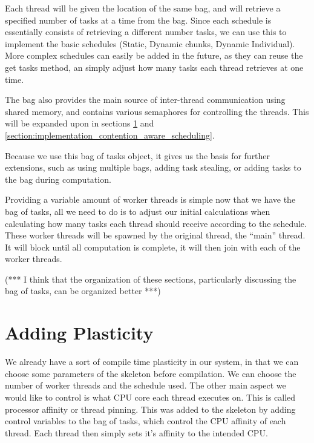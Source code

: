 Each thread will be given the location of the same bag, and will retrieve a specified number of tasks at a time from the bag. Since each schedule is essentially consists of retrieving a different number tasks, we can use this to implement the basic schedules (Static, Dynamic chunks, Dynamic Individual). More complex schedules can easily be added in the future, as they can reuse the get tasks method, an simply adjust how many tasks each thread retrieves at one time.  

The bag also provides the main source of inter-thread communication using shared memory, and contains various semaphores for controlling the threads. This will be expanded upon in sections \ref{section:implementation_adding_plasticity} and \ref{section:implementation_contention_aware_scheduling}.

Because we use this bag of tasks object, it gives us the basis for further extensions, such as using multiple bags, adding task stealing, or adding tasks to the bag during computation.

Providing a variable amount of worker threads is simple now that we have the bag of tasks, all we need to do is to adjust our initial calculations when calculating how many tasks each thread should receive according to the schedule. These worker threads will be spawned by the original thread, the ``main'' thread. It will block until all computation is complete, it will then join with each of the worker threads.

(*** I think that the organization of these sections, particularly discussing the bag of tasks, can be organized better ***)



\section{Adding Plasticity}
\label{section:implementation_adding_plasticity}

We already have a sort of compile time plasticity in our system, in that we can choose some parameters of the skeleton before compilation. We can choose the number of worker threads and the schedule used. The other main aspect we would like to control is what CPU core each thread executes on. This is called processor affinity or thread pinning. This was added to the skeleton by adding control variables to the bag of tasks, which control the CPU affinity of each thread. Each thread then simply sets it's affinity to the intended CPU.

